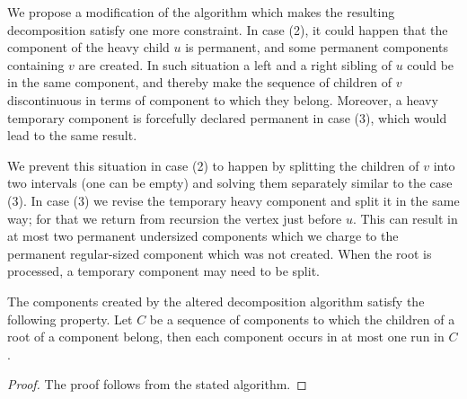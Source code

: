 \bigbreak

We propose a modification of the algorithm which makes the resulting decomposition satisfy one more constraint.
In case (2), it could happen that the component of the heavy child $u$ is permanent, and some permanent components containing $v$ are created.
In such situation a left and a right sibling of $u$ could be in the same component, and thereby make the sequence of children of $v$ discontinuous in terms of component to which they belong.
Moreover, a heavy temporary component is forcefully declared permanent in case (3), which would lead to the same result.

We prevent this situation in case (2) to happen by splitting the children of $v$ into two intervals (one can be empty) and solving them separately similar to the case (3).
In case (3) we revise the temporary heavy component and split it in the same way; for that we return from recursion the vertex just before $u$.
This can result in at most two permanent undersized components which we charge to the permanent regular-sized component which was not created.
When the root is processed, a temporary component may need to be split.

\begin{lemma}\label{l:decompose-property}
	The components created by the altered decomposition algorithm satisfy the following property.
	Let $C$ be a sequence of components to which the children of a root of a component belong, then each component occurs in at most one run in $C$.
\end{lemma}
\begin{proof}
	The proof follows from the stated algorithm.
\end{proof}

